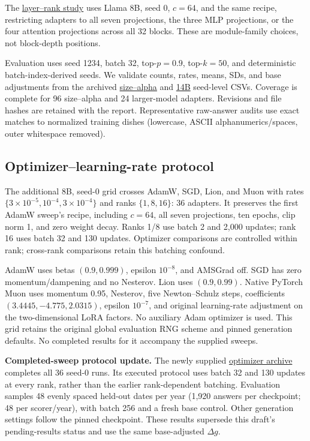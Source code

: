 The \href{https://huggingface.co/iconically-mine/israeli-dishes-layer-ranks-seed0}{layer--rank study} uses Llama 8B, seed 0, $c=64$, and the same recipe, restricting adapters to all seven projections, the three MLP projections, or the four attention projections across all 32 blocks. These are module-family choices, not block-depth positions.

Evaluation uses seed 1234, batch 32, top-$p=0.9$, top-$k=50$, and deterministic batch-index-derived seeds. We validate counts, rates, means, SDs, and base adjustments from the archived \href{https://huggingface.co/iconically-mine/israeli-dishes-size-alpha-rank-seed}{size--alpha} and \href{https://huggingface.co/iconically-mine/israeli-dishes-larger}{14B} seed-level CSVs. Coverage is complete for 96 size--alpha and 24 larger-model adapters. Revisions and file hashes are retained with the report. Representative raw-answer audits use exact matches to normalized training dishes (lowercase, ASCII alphanumerics/spaces, outer whitespace removed).

\subsection{Optimizer--learning-rate protocol}
The additional 8B, seed-0 grid crosses AdamW, SGD, Lion, and Muon with rates $\{3\times10^{-5},10^{-4},3\times10^{-4}\}$ and ranks $\{1,8,16\}$: 36 adapters. It preserves the first AdamW sweep's recipe, including $c=64$, all seven projections, ten epochs, clip norm 1, and zero weight decay. Ranks 1/8 use batch 2 and 2,000 updates; rank 16 uses batch 32 and 130 updates. Optimizer comparisons are controlled within rank; cross-rank comparisons retain this batching confound.

AdamW uses betas $(0.9,0.999)$, epsilon $10^{-8}$, and AMSGrad off. SGD has zero momentum/dampening and no Nesterov. Lion uses $(0.9,0.99)$. Native PyTorch Muon uses momentum 0.95, Nesterov, five Newton--Schulz steps, coefficients $(3.4445,-4.775,2.0315)$, epsilon $10^{-7}$, and original learning-rate adjustment on the two-dimensional LoRA factors. No auxiliary Adam optimizer is used. This grid retains the original global evaluation RNG scheme and pinned generation defaults. No completed results for it accompany the supplied sweeps.

\textbf{Completed-sweep protocol update.} The newly supplied \href{https://huggingface.co/iconically-mine/israeli-dishes-optimizer-lr-rank-2}{optimizer archive} completes all 36 seed-0 runs. Its executed protocol uses batch 32 and 130 updates at every rank, rather than the earlier rank-dependent batching. Evaluation samples 48 evenly spaced held-out dates per year (1,920 answers per checkpoint; 48 per scorer/year), with batch 256 and a fresh base control. Other generation settings follow the pinned checkpoint. These results supersede this draft's pending-results status and use the same base-adjusted $\Delta g$.

